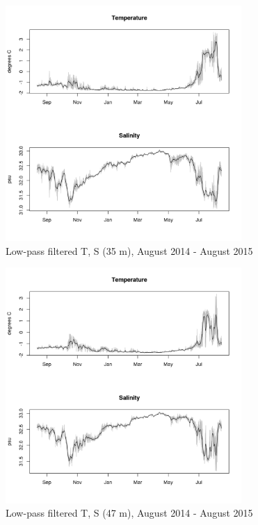 \documentclass[12pt]{dforeport}
\begin{document}
\begin{figure}  
\centering
\includegraphics[width = 0.8\textwidth]{./figures/28_lpf_TS_35m_2014_2015.png}
\caption[Low-pass filtered T, S (35 m), 2014-2015]{Low-pass filtered T, S (35 m), August 2014 - August 2015}
\label{f:ctd_35_lpf_2014_2015}
\end{figure}

\begin{figure}  
\centering
\includegraphics[width = 0.8\textwidth]{./figures/29_lpf_TS_47m_2014_2015.png}
\caption[Low-pass filtered T, S (47 m), 2014-2015]{Low-pass filtered T, S (47 m), August 2014 - August 2015}
\label{f:ctd_47_lpf_2014_2015}
\end{figure}
\end{document}
